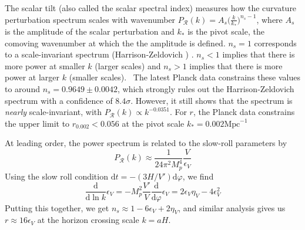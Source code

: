 \documentclass[aps,prd,reprint,preprintnumbers,showpacs,floatfix,nofootinbib,superscript address]{revtex4-2}
\newcommand{\wb}[1]{{\color[RGB]{255,0,0}{\textbf{\textit{[WB: #1]}}}}}
\begin{document}
The scalar tilt (also called the scalar spectral index) measures how the curvature perturbation spectrum scales with wavenumber $P_\mathcal{R}(k) = A_s\big(\frac{k}{k_*}\big)^{n_s-1}$, where $A_s$ is the amplitude of the scalar perturbation and $k_*$ is the pivot scale, the comoving wavenumber at which the the amplitude is defined. $n_s = 1$ corresponds to a scale-invariant spectrum (Harrison‑Zeldovich \cite{harrison_fluctuations_1970, zeldovich_hypothesis_1972, peebles_primeval_1970})
. $n_s < 1$ implies that there is more power at smaller $k$ (larger scales) and $n_s > 1$ implies that there is more power at larger $k$ (smaller scales). 
\
The latest Planck data \cite{collaboration_planck_2020} constrains these values to around $n_s = 0.9649 \pm 0.0042$, which strongly rules out the Harrison‑Zeldovich spectrum with a confidence of $8.4\sigma$. However, it still shows that the spectrum is \textit{nearly} scale-invariant, with $P_\mathcal{R}(k) \propto k^{-0.0351}$. For $r$, the Planck data constrains the upper limit to $r_{0.002} < 0.056$ at the pivot scale $k_* =0.002 \text{Mpc}^{-1}$

At leading order, the power spectrum is related to the slow-roll parameters by \cite{liddle_cosmological_2000}
\begin{equation}
    P_\mathcal{R}(k) \approx \frac{1}{24\pi^2 M_p^4} \frac{V}{\epsilon_V}
\end{equation}
Using the slow roll condition $\text{d}t = -(3H/V') \text{d}\varphi$, we find
\begin{equation}
    \frac{\text{d}}{\text{d} \ln k} \epsilon_V = -M_p^2 \frac{V'}{V}\frac{\text{d}}{\text{d}\varphi}\epsilon_V = 2\epsilon_V\eta_V - 4\epsilon_V^2
\end{equation}
Putting this together, we get $n_s \approx 1 -6\epsilon_V +2\eta_V$, and similar analysis \cite{baumann2012tasilecturesinflation} gives us $r \approx 16 \epsilon_V$ at the horizon crossing scale $k = aH$.
\end{document}
